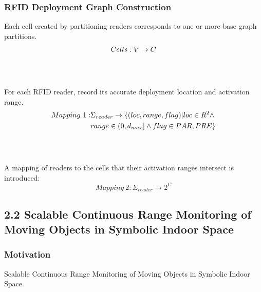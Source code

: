 \documentclass{beamer}
\begin{document}
\begin{frame}
\frametitle{RFID Deployment Graph Construction}

\small{Each cell created by partitioning readers corresponds to one or more base graph partitions.}
\pause
\begin{equation}
\mathnormal{Cells: V \rightarrow C}
\end{equation}
\\~\\
\pause

\small{For each RFID reader, record its accurate deployment location and activation range.}
\pause
\begin{equation}
\mathnormal{
\begin{aligned}
Mapping~1: &\Sigma_{reader} \rightarrow \{ (loc, range, flag) | loc \in R^2 \wedge \\
  &range \in (0,d_{max}] \wedge flag \in {PAR, PRE} \}
\end{aligned}
}
\end{equation}
\\~\\
\pause

\small{A mapping of readers to the cells that their activation ranges intersect is introduced:}
\pause
\begin{equation}
Mapping~2: \Sigma_{reader} \rightarrow 2^C
\end{equation}

\end{frame}



\subsection{2.2 Scalable Continuous Range Monitoring of Moving Objects in Symbolic Indoor Space} %

\begin{frame}
\frametitle{Motivation}
Scalable Continuous Range Monitoring of Moving Objects in Symbolic Indoor Space.~\cite{DBLP:conf/cikm/YangLJ09}\\~\\


\end{frame}

\end{document}
